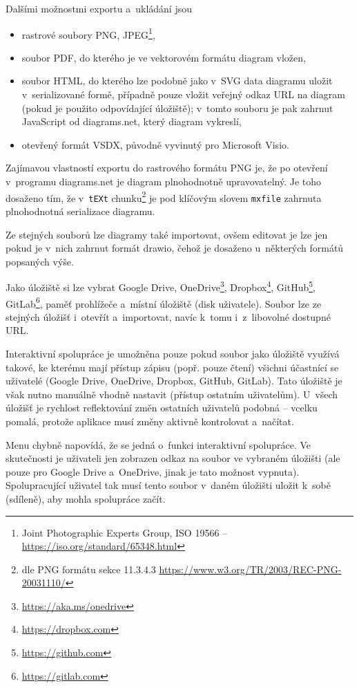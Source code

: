 Dalšími možnostmi exportu a~ukládání jsou
\begin{itemize}
  \item rastrové soubory PNG, JPEG\footnote{Joint Photographic Experts Group, ISO 19566 -- \url{https://iso.org/standard/65348.html}},
  \item soubor PDF, do kterého je ve vektorovém formátu diagram vložen,
  \item soubor HTML, do kterého lze podobně jako v~SVG data diagramu uložit v~serializované formě, případně pouze vložit veřejný odkaz URL na diagram (pokud je použito odpovídající úložiště);
        v~tomto souboru je pak zahrnut JavaScript od diagrams.net, který diagram vykreslí,
  \item otevřený formát VSDX, původně vyvinutý pro Microsoft Visio.
\end{itemize}

Zajímavou vlastností exportu do rastrového formátu PNG je, že po otevření v~programu diagrams.net je diagram plnohodnotně upravovatelný.
Je toho dosaženo tím, že v~\texttt{tEXt} chunku\footnote{dle PNG formátu sekce 11.3.4.3 \url{https://www.w3.org/TR/2003/REC-PNG-20031110/}}
je pod klíčovým slovem \texttt{mxfile} zahrnuta plnohodnotná serializace diagramu.

Ze stejných souborů lze diagramy také importovat, ovšem editovat je lze jen pokud je v~nich zahrnut formát drawio, čehož je dosaženo u~některých formátů popsaných výše.

Jako úložiště si lze vybrat Google Drive,
OneDrive\footnote{\url{https://aka.ms/onedrive}},
Dropbox\footnote{\url{https://dropbox.com}},
GitHub\footnote{\url{https://github.com}},
GitLab\footnote{\url{https://gitlab.com}},
paměť prohlížeče a~místní úložiště (disk uživatele).
Soubor lze ze stejných úložišť i~otevřít a~importovat, navíc k~tomu i~z~libovolné dostupné URL.

Interaktivní spolupráce je umožněna pouze pokud soubor jako úložiště využívá takové, ke kterému mají přístup zápisu (popř. pouze čtení) všichni účastnící se uživatelé (Google Drive, OneDrive, Dropbox, GitHub, GitLab).
Tato úložiště je však nutno manuálně vhodně nastavit (přístup ostatním uživatelům).
U~všech úložišť je rychlost reflektování změn ostatních uživatelů podobná -- vcelku pomalá, protože aplikace musí změny aktivně kontrolovat a~načítat.

Menu  chybně napovídá, že se jedná o~funkci interaktivní spolupráce.
Ve skutečnosti je uživateli jen zobrazen odkaz na soubor ve vybraném úložišti (ale pouze pro Google Drive a~OneDrive, jinak je tato možnost vypnuta).
Spolupracující uživatel tak musí tento soubor v~daném úložišti uložit k~sobě (sdíleně), aby mohla spolupráce začít.


